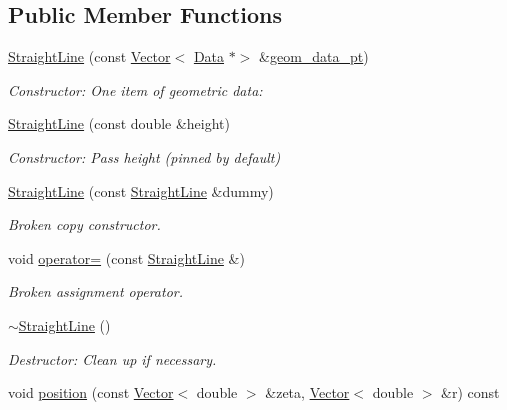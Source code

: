 \subsection*{Public Member Functions}
\begin{DoxyCompactItemize}
\item 
\hyperlink{classoomph_1_1StraightLine_aa6f5e08be3943889e1357ffec283528d}{Straight\+Line} (const \hyperlink{classoomph_1_1Vector}{Vector}$<$ \hyperlink{classoomph_1_1Data}{Data} $\ast$$>$ \&\hyperlink{classoomph_1_1StraightLine_ad1e8c652c277e1f7649a5afb5711afc0}{geom\+\_\+data\+\_\+pt})
\begin{DoxyCompactList}\small\item\em Constructor\+: One item of geometric data\+: \end{DoxyCompactList}\item 
\hyperlink{classoomph_1_1StraightLine_a90eb98ffdfc4fcfae90f49230bcd0603}{Straight\+Line} (const double \&height)
\begin{DoxyCompactList}\small\item\em Constructor\+: Pass height (pinned by default) \end{DoxyCompactList}\item 
\hyperlink{classoomph_1_1StraightLine_a89b03f4db2dbd72aba9504b4046f9594}{Straight\+Line} (const \hyperlink{classoomph_1_1StraightLine}{Straight\+Line} \&dummy)
\begin{DoxyCompactList}\small\item\em Broken copy constructor. \end{DoxyCompactList}\item 
void \hyperlink{classoomph_1_1StraightLine_abec0557bf6cca23737db39767457059a}{operator=} (const \hyperlink{classoomph_1_1StraightLine}{Straight\+Line} \&)
\begin{DoxyCompactList}\small\item\em Broken assignment operator. \end{DoxyCompactList}\item 
\hyperlink{classoomph_1_1StraightLine_a767d33f859268e751729e69f18a559a9}{$\sim$\+Straight\+Line} ()
\begin{DoxyCompactList}\small\item\em Destructor\+: Clean up if necessary. \end{DoxyCompactList}\item 
void \hyperlink{classoomph_1_1StraightLine_a96aedd167e5529eb7db60a63efad5884}{position} (const \hyperlink{classoomph_1_1Vector}{Vector}$<$ double $>$ \&zeta, \hyperlink{classoomph_1_1Vector}{Vector}$<$ double $>$ \&r) const
$$
\end{DoxyCompactItemize}
